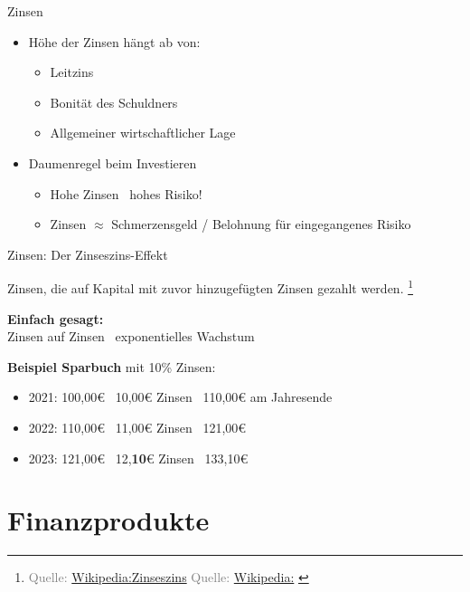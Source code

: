 \documentclass{beamer}
\newcommand{\n}{\hfill\\\vspace{0.25cm}}
\let\oldfootnote\footnote
\renewcommand{\footnote}[1]
{%
	\oldfootnote
	{
		\tiny
		\textcolor{gray}{#1}
	}%
}
\newcommand{\citewiki}[2][]
{%
	\footnote
	{
		\ifthenelse{\isempty{#1}}
		{
			Quelle: \href{https://de.wikipedia.org/wiki/#2}{Wikipedia:#2}
		}
		{
			Quelle: \href{https://de.wikipedia.org/wiki/#2}{Wikipedia:#1}
		}
	}
}
\begin{document}
			\begin{frame}{Zinsen}
				\begin{itemize}
					\item Höhe der Zinsen hängt ab von:
					\begin{itemize}
						\item Leitzins
						\item Bonität des Schuldners
						\item Allgemeiner wirtschaftlicher Lage
					\end{itemize}
					\item Daumenregel beim Investieren
					\begin{itemize}
						\item Hohe Zinsen \textrightarrow\ hohes Risiko!
						\item Zinsen $\approx$ Schmerzensgeld / Belohnung für eingegangenes Risiko
					\end{itemize}
				\end{itemize}
			\end{frame}
		
			\begin{frame}{Zinsen: Der Zinseszins-Effekt}
				\begin{definition}
					Zinsen, die auf Kapital mit zuvor hinzugefügten Zinsen gezahlt werden.\citewiki{Zinseszins}
				\end{definition}
				\textbf{Einfach gesagt:}\\
				Zinsen auf Zinsen \textrightarrow\ exponentielles Wachstum\n
				
				\textbf{Beispiel Sparbuch} mit 10\% Zinsen:
				\begin{itemize}
					\item 2021: 100,00€ \textrightarrow\ 10,00€ Zinsen \textrightarrow\ 110,00€ am Jahresende
					\item 2022: 110,00€ \textrightarrow\ 11,00€ Zinsen \textrightarrow\ 121,00€
					\item 2023: 121,00€ \textrightarrow\ 12,\textbf{10}€ Zinsen \textrightarrow\ 133,10€
				\end{itemize}
			\end{frame}
	
	\section{Finanzprodukte}
	
		\begin{frame}
		\end{frame}
	
\end{document}
